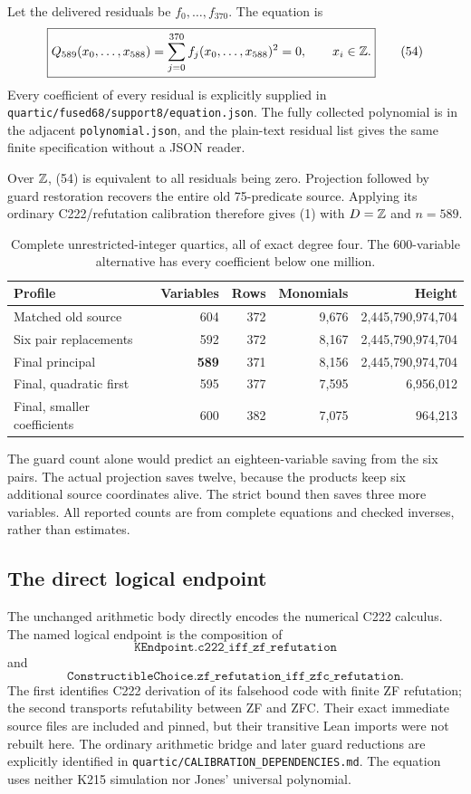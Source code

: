 Let the delivered residuals be $f_0,\ldots,f_{370}$. The equation is
\[
\boxed{
Q_{589}(x_0,\ldots,x_{588})
=\sum_{j=0}^{370}f_j(x_0,\ldots,x_{588})^2=0,
\qquad x_i\in\mathbb Z.
}
\tag{54}
\]
Every coefficient of every residual is explicitly supplied in
\texttt{quartic/fused68/support8/equation.json}.
The fully collected polynomial is in the adjacent
\texttt{polynomial.json}, and the plain-text residual list gives the same
finite specification without a JSON reader.

Over $\mathbb Z$, (54) is equivalent to all residuals being zero.
Projection followed by guard restoration recovers the entire old
75-predicate source. Applying its ordinary C222/refutation calibration
therefore gives (1) with $D=\mathbb Z$ and $n=589$.

\begin{table}[ht]
\centering\small
\begin{tabular}{@{}lrrrr@{}}
\toprule
Profile & Variables & Rows & Monomials & Height\\
\midrule
Matched old source &604&372&9,676&2,445,790,974,704\\
Six pair replacements &592&372&8,167&2,445,790,974,704\\
Final principal &\textbf{589}&371&8,156&2,445,790,974,704\\
Final, quadratic first &595&377&7,595&6,956,012\\
Final, smaller coefficients &600&382&7,075&964,213\\
\bottomrule
\end{tabular}
\caption{Complete unrestricted-integer quartics, all of exact degree four.
The 600-variable alternative has every coefficient below one million.}
\label{tab:quartics}
\end{table}

The guard count alone would predict an eighteen-variable saving from the
six pairs. The actual projection saves twelve, because the products keep
six additional source coordinates alive. The strict bound then saves
three more variables. All reported counts are from complete equations
and checked inverses, rather than estimates.

\subsection{The direct logical endpoint}

The unchanged arithmetic body directly encodes the numerical C222 calculus.
The named logical endpoint is the composition of
\[
\texttt{KEndpoint.c222\_iff\_zf\_refutation}
\]
and
\[
\texttt{ConstructibleChoice.zf\_refutation\_iff\_zfc\_refutation}.
\]
The first identifies C222 derivation of its falsehood code with finite
ZF refutation; the second transports refutability between ZF and ZFC.
Their exact immediate source files are included and pinned, but their
transitive Lean imports were not rebuilt here.
The ordinary arithmetic bridge and later guard reductions are explicitly
identified in \texttt{quartic/CALIBRATION\_DEPENDENCIES.md}.
The equation uses neither K215 simulation nor Jones' universal polynomial.

